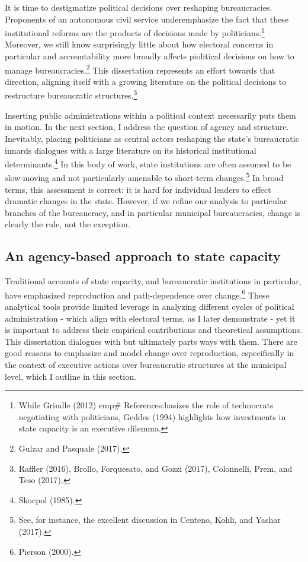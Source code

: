 \documentclass[12pt,]{article}
\let\rmarkdownfootnote\footnote%
\def\footnote{\protect\rmarkdownfootnote}
\begin{document}
It is time to destigmatize political decisions over reshaping
bureaucracies. Proponents of an autonomous civil service underemphasize
the fact that these institutional reforms are the products of decisions
made by politicians.\footnote{While Grindle (2012) emp\#
  References:hasizes the role of technocrats negotiating with
  politicians, Geddes (1994) highlights how investments in state
  capacity is an executive dilemma.} Moreover, we still know
surprisingly little about how electoral concerns in particular and
accountability more broadly affects piolitical decisions on how to
manage bureaucracies.\footnote{Gulzar and Pasquale (2017).} This
dissertation represents an effort towards that direction, aligning
itself with a growing literature on the political decisions to
restructure bureaucratic structures.\footnote{Raffler (2016), Brollo,
  Forquesato, and Gozzi (2017), Colonnelli, Prem, and Teso (2017).}

Inserting public administrations within a political context necessarily
puts them in motion. In the next section, I address the question of
agency and structure. Inevitably, placing politicians as central actors
reshaping the state's bureaucratic innards dialogues with a large
literature on its historical institutional determinants.\footnote{Skocpol
  (1985).} In this body of work, state institutions are often assumed to
be slow-moving and not particularly amenable to short-term
changes.\footnote{See, for instance, the excellent discussion in
  Centeno, Kohli, and Yashar (2017).} In broad terms, this assessment is
correct: it is hard for individual leaders to effect dramatic changes in
the state. However, if we refine our analysis to particular branches of
the bureaucracy, and in particular municipal bureaucracies, change is
clearly the rule, not the exception.

\hypertarget{an-agency-based-approach-to-state-capacity}{%
\subsection{An agency-based approach to state
capacity}\label{an-agency-based-approach-to-state-capacity}}

Traditional accounts of state capacity, and bureaucratic institutions in
particular, have emphasized reproduction and path-dependence over
change.\footnote{Pierson (2000).} These analytical tools provide limited
leverage in analyzing different cycles of political administration -
which align with electoral terms, as I later demonstrate - yet it is
important to address their empirical contributions and theoretical
assumptions. This dissertation dialogues with but ultimately parts ways
with them. There are good reasons to emphasize and model change over
reproduction, especifically in the context of executive actions over
bureaucratic structures at the municipal level, which I outline in this
section.
\end{document}
